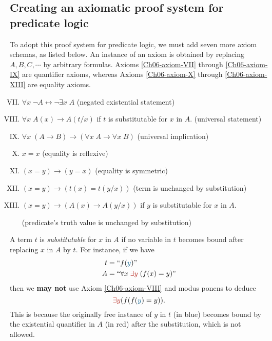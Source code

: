 \subsection{Creating an axiomatic proof system for predicate logic}

To adopt this proof system for predicate logic, we must add seven more axiom schemas, as listed below.  An instance of an axiom is obtained by replacing \(A, B, C, \cdots\) by arbitrary formulas. Axioms \ref{Ch06-axiom-VII} through \ref{Ch06-axiom-IX} are quantifier axioms, whereas Axioms \ref{Ch06-axiom-X} through \ref{Ch06-axiom-XIII} are equality axioms.
%
\begin{enumerate}[I.]
    \setcounter{enumi}{6}
    \item \(\forall x\; \neg A \leftrightarrow \neg\exists x\; A\)
    \hfill (negated existential statement)
    \label{Ch06-axiom-VII}
    
    \item \(\forall x\; A(x) \rightarrow A(t/x)\) \;\; if \(t\) is substitutable for \(x\) in \(A\).
    \hfill (universal statement)
    \label{Ch06-axiom-VIII}
    
    \item \(\forall x\; (A \rightarrow B) \rightarrow (\forall x\; A \rightarrow \forall x\; B)\)
    \hfill (universal implication)
    \label{Ch06-axiom-IX}

    \item \(x = x\)
    \hfill (equality is reflexive)
    \label{Ch06-axiom-X}
    
    \item \((x = y) \rightarrow (y = x)\)
    \hfill (equality is symmetric)
    \label{Ch06-axiom-XI}
    
    \item \((x = y) \rightarrow (t(x) = t(y/x))\)
    \hfill (term is unchanged by substitution)
    \label{Ch06-axiom-XII}

    \item \((x = y) \rightarrow (A(x) \rightarrow A(y/x))\)\;\; if \(y\) is substitutable for \(x\) in \(A\).
    
    \hfill (predicate's truth value is unchanged by substitution)
    \label{Ch06-axiom-XIII}
\end{enumerate}

A term \(t\) is \emph{substitutable} for \(x\) in \(A\) if no variable in \(t\) becomes bound after replacing \(x\) in \(A\) by \(t\). For instance, if we have
%
\begin{align*}
    t &= ``f({\color{MidnightBlue} y})"\\
    A &= ``\forall x\; {\color{BrickRed}\exists y}\; (f(x) = y)"
\end{align*}
%
then we \textbf{may not} use Axiom \ref{Ch06-axiom-VIII} and modus ponens to deduce
%
\[{\color{BrickRed}\exists y} (f(f({\color{MidnightBlue} y}) = y))\text{.}\]
%
This is because the originally free instance of \(y\) in \(t\) (in blue) becomes bound by the existential quantifier in \(A\) (in red) after the substitution, which is not allowed.

